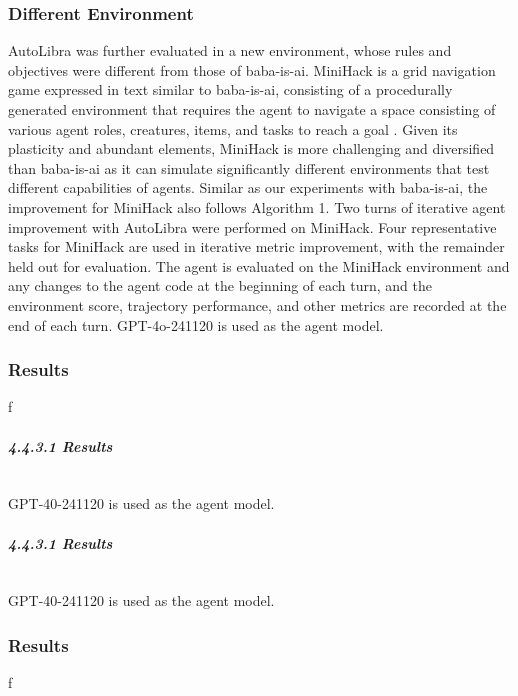 \subsubsection{Different Environment}

AutoLibra was further evaluated in a new environment, whose rules and objectives were different from those of baba-is-ai. MiniHack is a grid navigation game expressed in text similar to baba-is-ai, consisting of a procedurally generated environment that requires the agent to navigate a space consisting of various agent roles, creatures, items, and tasks to reach a goal \cite{samvelyan2021minihackplanetsandboxopenended}. Given its plasticity and abundant elements, MiniHack is more challenging and diversified than baba-is-ai as it can simulate significantly different environments that test different capabilities of agents. Similar as our experiments with baba-is-ai, the improvement for MiniHack also follows Algorithm 1. Two turns of iterative agent improvement with AutoLibra were performed on MiniHack. Four representative tasks for MiniHack are used in iterative metric improvement, with the remainder held out for evaluation. The agent is evaluated on the MiniHack environment and any changes to the agent code at the beginning of each turn, and the environment score, trajectory performance, and other metrics are recorded at the end of each turn. GPT-4o-241120 is used as the agent model.

\subsubsection{Results}

f

\paragraph{\textit{4.4.3.1 Results}}~\newline 
\\GPT-40-241120 is used as the agent model.
\paragraph{\textit{4.4.3.1 Results}}~\newline 
\\GPT-40-241120 is used as the agent model.

\subsubsection{Results}

f

